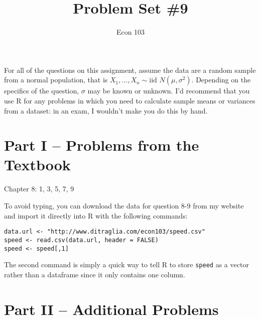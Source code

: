 \documentclass[addpoints,12pt]{exam}\usepackage[]{graphicx}\usepackage[]{color}
\title{Problem Set \#9}
\author{Econ 103}
\date{}
\begin{document}
\maketitle




\noindent For all of the questions on this assignment, assume the data are a random sample from a normal population, that is $X_1, \hdots, X_n \sim \mbox{iid } N(\mu, \sigma^2)$. Depending on the specifics of the question, $\sigma$ may be known or unknown. I'd recommend that you use R for any problems in which you need to calculate sample means or variances from a dataset: in an exam, I wouldn't make you do this by hand.

\section*{Part I -- Problems from the Textbook}
Chapter 8: 1, 3, 5, 7, 9

\vspace{1em}
\noindent To avoid typing, you can download the data for question 8-9 from my website and import it directly into R with the following commands:
\begin{verbatim}
data.url <- "http://www.ditraglia.com/econ103/speed.csv"
speed <- read.csv(data.url, header = FALSE)
speed <- speed[,1]
\end{verbatim}
The second command is simply a quick way to tell R to store \texttt{speed} as a vector rather than a dataframe since it only contains one column.
\section*{Part II -- Additional Problems}
\end{document}
